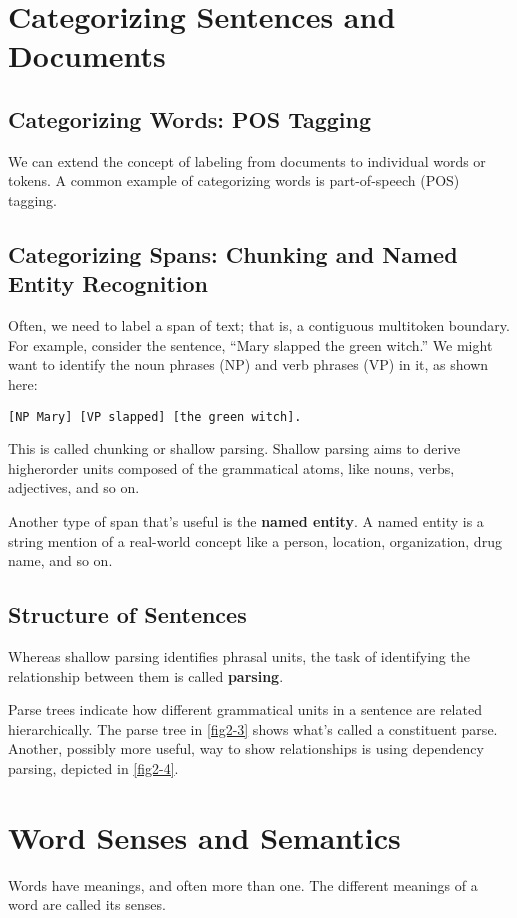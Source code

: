 \section{Categorizing Sentences and Documents}
\subsection{Categorizing Words: POS Tagging}
We can extend the concept of labeling from documents to individual words or
tokens. A common example of categorizing words is part-of-speech (POS) tagging.

\subsection{Categorizing Spans: Chunking and Named Entity Recognition}
Often, we need to label a span of text; that is, a contiguous multitoken boundary. For
example, consider the sentence, “Mary slapped the green witch.” We might want to
identify the noun phrases (NP) and verb phrases (VP) in it, as shown here:

\verb|[NP Mary] [VP slapped] [the green witch].|

This is called chunking or shallow parsing. Shallow parsing aims to derive higherorder units composed of the grammatical atoms, like nouns, verbs, adjectives, and so
on.

Another type of span that's useful is the \textbf{named entity}. A named entity is a string
mention of a real-world concept like a person, location, organization, drug name, and
so on.

\subsection*{Structure of Sentences}
Whereas shallow parsing identifies phrasal units, the task of identifying the relationship between them is called \textbf{parsing}.


Parse trees indicate how different grammatical units in a sentence are related hierarchically. The parse tree in \autoref{fig2-3} shows what's called a constituent parse.
Another, possibly more useful, way to show relationships is using dependency parsing, depicted in \autoref{fig2-4}.


\section{Word Senses and Semantics}
Words have meanings, and often more than one. The different meanings of a word
are called its senses.